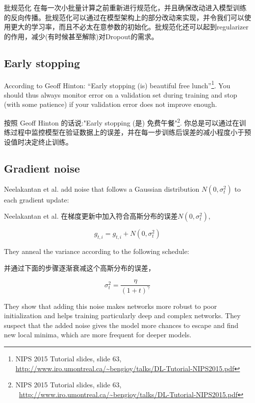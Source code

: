 \documentclass{article}
\begin{document}
批规范化 \cite{Ioffe2015a} 在每一次小批量计算之前重新进行规范化，并且确保改动进入模型训练的反向传播。批规范化可以通过在模型架构上的部分改动来实现，并令我们可以使用更大的学习率，而且不必太在意参数的初始化。批规范化还可以起到regularizer的作用，减少(有时候甚至解除)对Dropout的需求。

\subsection{Early stopping}

According to Geoff Hinton: ``Early stopping (is) beautiful free lunch''\footnote{NIPS 2015 Tutorial slides, slide 63,  \url{http://www.iro.umontreal.ca/~bengioy/talks/DL-Tutorial-NIPS2015.pdf}}. You should thus always monitor error on a validation set during training and stop (with some patience) if your validation error does not improve enough.

按照 Geoff Hinton 的话说:"Early stopping (是) 免费午餐"\footnote{NIPS 2015 Tutorial slides, slide 63,  \url{http://www.iro.umontreal.ca/~bengioy/talks/DL-Tutorial-NIPS2015.pdf}}. 你总是可以通过在训练过程中监控模型在验证数据上的误差，并在每一步训练后误差的减小程度小于预设值时决定终止训练。

\subsection{Gradient noise}

Neelakantan et al. \cite{Neelakantan2015} add noise that follows a Gaussian distribution $N(0, \sigma^2_t)$ to each gradient update:

Neelakantan et al. \cite{Neelakantan2015} 在梯度更新中加入符合高斯分布的误差$N(0, \sigma^2_t)$,

\begin{equation}
g_{t, i} = g_{t, i} + N(0, \sigma^2_t)
\end{equation}

They anneal the variance according to the following schedule:

并通过下面的步骤逐渐衰减这个高斯分布的误差，

\begin{equation}
\sigma^2_t = \frac{\eta}{(1 + t)^\gamma}
\end{equation}

They show that adding this noise makes networks more robust to poor initialization and helps training particularly deep and complex networks. They suspect that the added noise gives the model more chances to escape and find new local minima, which are more frequent for deeper models.
\end{document}
